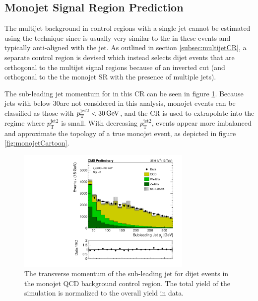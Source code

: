 \subsection{Monojet Signal Region Prediction}
\label{subsec:qcdMonojet}
The multijet background in control regions with a single jet cannot be estimated using the \dphi technique since \MET is usually very similar to the \HT in these events and typically anti-aligned with the jet. As outlined in section \ref{subsec:multijetCR}, a separate control region is devised which instead selects dijet events that are orthogonal to the multijet signal regions because of an inverted \dphilong cut (and orthogonal to the the monojet SR with the presence of multiple jets). 

The sub-leading jet momentum for in this CR can be seen in figure \ref{fig:subleadingJetPt}. Because jets with \pt below 30\GeV are not considered in this analysis, monojet events can be classified as those with $p_{\mathrm{T}}^{\mathrm{jet2}} < 30\,\text{Ge\hspace{-.08em}V}$, and the CR is used to extrapolate into the regime where $p_{\mathrm{T}}^{\mathrm{jet2}}$ is small. With decreasing $p_{\mathrm{T}}^{\mathrm{jet2}}$, events appear more imbalanced and approximate the topology of a true monojet event, as depicted in figure \ref{fig:monojetCartoon}.
\begin{figure}
	\centering
	\includegraphics[width=0.75\textwidth]{backgrounds/figs/jet2_pt_35p9ifb}
	\renewcommand{\baselinestretch}{1.0}
	\caption[The transverse momentum of the sub-leading jet for dijet events in the monojet QCD background control region.]{The transverse momentum of the sub-leading jet for dijet events in the monojet QCD background control region. The total yield of the simulation is normalized to the overall yield in data.}
	\label{fig:subleadingJetPt}
\end{figure}
